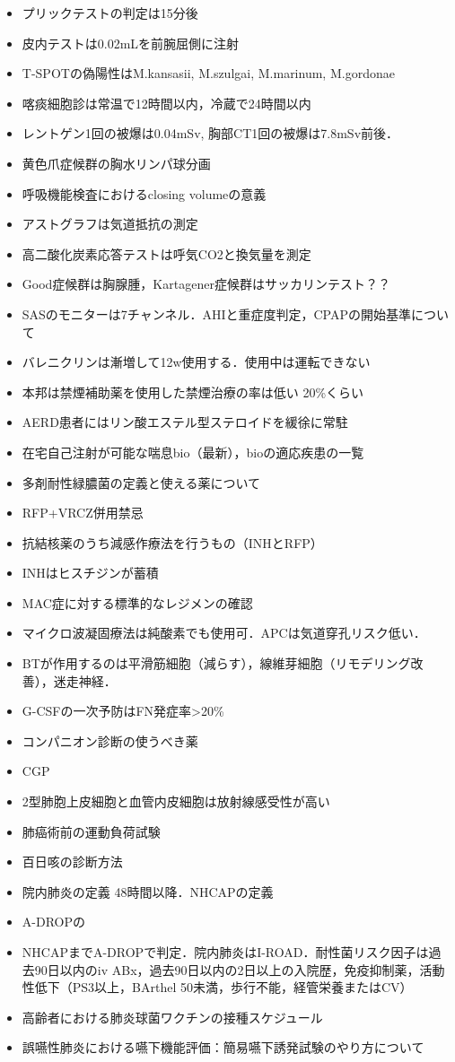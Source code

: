 \begin{itemize}
\item プリックテストの判定は15分後
\item 皮内テストは0.02mLを前腕屈側に注射
\item T-SPOTの偽陽性はM.kansasii, M.szulgai, M.marinum, M.gordonae
\item 喀痰細胞診は常温で12時間以内，冷蔵で24時間以内
\item レントゲン1回の被爆は0.04mSv, 胸部CT1回の被爆は7.8mSv前後．
\item 黄色爪症候群の胸水リンパ球分画

\item 呼吸機能検査におけるclosing volumeの意義
\item アストグラフは気道抵抗の測定
\item 高二酸化炭素応答テストは呼気CO2と換気量を測定
\item Good症候群は胸腺腫，Kartagener症候群はサッカリンテスト？？
\item SASのモニターは7チャンネル．AHIと重症度判定，CPAPの開始基準について
\item バレニクリンは漸増して12w使用する．使用中は運転できない
\item 本邦は禁煙補助薬を使用した禁煙治療の率は低い 20\%くらい
\item AERD患者にはリン酸エステル型ステロイドを緩徐に常駐
\item 在宅自己注射が可能な喘息bio（最新），bioの適応疾患の一覧
\item 多剤耐性緑膿菌の定義と使える薬について
\item RFP+VRCZ併用禁忌
\item 抗結核薬のうち減感作療法を行うもの（INHとRFP）
\item INHはヒスチジンが蓄積
\item MAC症に対する標準的なレジメンの確認
\item マイクロ波凝固療法は純酸素でも使用可．APCは気道穿孔リスク低い．
\item BTが作用するのは平滑筋細胞（減らす），線維芽細胞（リモデリング改善），迷走神経．

\item G-CSFの一次予防はFN発症率>20\% 
\item コンパニオン診断の使うべき薬
\item CGP
\item 2型肺胞上皮細胞と血管内皮細胞は放射線感受性が高い
\item 肺癌術前の運動負荷試験
\item 百日咳の診断方法
\item 院内肺炎の定義 48時間以降．NHCAPの定義
\item A-DROPの
\item NHCAPまでA-DROPで判定．院内肺炎はI-ROAD．耐性菌リスク因子は過去90日以内のiv ABx，過去90日以内の2日以上の入院歴，免疫抑制薬，活動性低下（PS3以上，BArthel 50未満，歩行不能，経管栄養またはCV）
\item 高齢者における肺炎球菌ワクチンの接種スケジュール
\item 誤嚥性肺炎における嚥下機能評価：簡易嚥下誘発試験のやり方について
\end{itemize}

